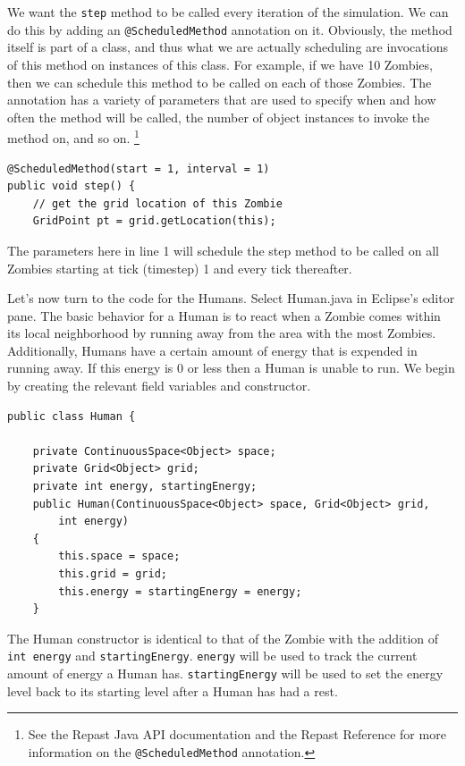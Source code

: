 \documentclass[11pt]{amsart}
\begin{document}
We want the \texttt{step} method to be called every iteration of the simulation. We can do this by adding an \texttt{@ScheduledMethod} annotation on it. Obviously, the method itself is part of a class, and thus what we are actually scheduling are invocations of this method on instances of this class. For example, if we have 10 Zombies, then we can schedule this method to be called on each of those Zombies. The annotation has a variety of parameters that are used to specify when and how often the method will be called, the number of object instances to invoke the method on, and so on. \footnote{See the Repast Java API documentation and the Repast Reference for more information on the \texttt{@ScheduledMethod} annotation.} 

\noindent\begin{minipage}[h]{\textwidth}
\vspace{.2in}
\lstset{language=java,caption=Step Method with Annotation}
\begin{lstlisting}
@ScheduledMethod(start = 1, interval = 1)
public void step() {
	// get the grid location of this Zombie
	GridPoint pt = grid.getLocation(this);
\end{lstlisting}
\vspace{.2in}
\end{minipage}

The parameters here in line 1 will schedule the step method to be called on all Zombies starting at tick (timestep) 1 and every tick thereafter. 

Let's now turn to the code for the Humans. Select Human.java in Eclipse's editor pane. The basic behavior for a Human is to react when a Zombie comes within its local neighborhood by running away from the area with the most Zombies. Additionally, Humans have  a certain amount of energy that is expended in running away. If this energy is 0 or less then a Human is unable to run. We begin by creating the relevant field variables and constructor.

\noindent\begin{minipage}[h]{\textwidth}
\vspace{.2in}
\lstset{language=java,caption=Human Constructor and Variables}
\begin{lstlisting}
public class Human {
	
	private ContinuousSpace<Object> space;
	private Grid<Object> grid;
	private int energy, startingEnergy;
	public Human(ContinuousSpace<Object> space, Grid<Object> grid, 
		int energy) 
	{	
		this.space = space;
		this.grid = grid;
		this.energy = startingEnergy = energy;
	}
\end{lstlisting}
\vspace{.2in}
\end{minipage}
The Human constructor is identical to that of the Zombie with the addition of \texttt{int energy} and \texttt{startingEnergy}. \texttt{energy} will be used to track the current amount of energy a Human has.  \texttt{startingEnergy} will be used to set the energy level back to its starting level after a Human has had a rest. 
\end{document}
